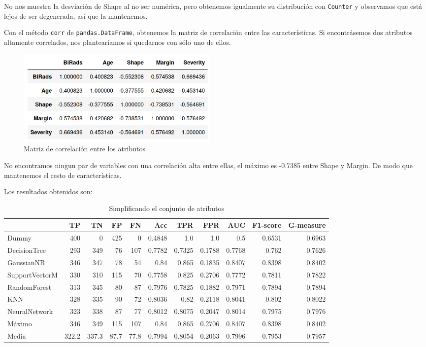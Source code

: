\documentclass{article}
\begin{document}
No nos muestra la desviación de Shape al no ser numérica, pero
obtenemos igualmente su distribución con \texttt{Counter} y observamos
que está lejos de ser degenerada, así que la mantenemos.

Con el método \texttt{corr} de \texttt{pandas.DataFrame}, obtenemos la
matriz de correlación entre las características. Si encontrásemos dos
atributos altamente correlados, nos plantearíamos si quedarnos con
sólo uno de ellos.

\begin{figure}[H]
  \centering
  \includegraphics[width=100mm]{figures/corr}
  \caption{Matriz de correlación entre los atributos}
  \label{fig:corr}
\end{figure}

No encontramos ningun par de variables con una correlación alta entre
ellas, el máximo es -0.7385 entre Shape y Margin. De modo que
mantenemos el resto de características.

Los resultados obtenidos son:

\begin{table}[H]
\centering
\caption{Simplificando el conjunto de atributos}
\label{tab:features}
\begin{tabular}{|lrrrrrrrrrr|}
\hline
 & TP & TN & FP & FN & Acc & TPR & FPR & AUC & F1-score & G-measure\\ \hline
Dummy & 400 & 0 & 425 & 0 & 0.4848 & 1.0 & 1.0 & 0.5 & 0.6531 & 0.6963\\
DecisionTree & 293 & 349 & 76 & 107 & 0.7782 & 0.7325 & 0.1788 & 0.7768 & 0.762 & 0.7626\\
GaussianNB & 346 & 347 & 78 & 54 & 0.84 & 0.865 & 0.1835 & 0.8407 & 0.8398 & 0.8402\\
SupportVectorM & 330 & 310 & 115 & 70 & 0.7758 & 0.825 & 0.2706 & 0.7772 & 0.7811 & 0.7822\\
RandomForest & 313 & 345 & 80 & 87 & 0.7976 & 0.7825 & 0.1882 & 0.7971 & 0.7894 & 0.7894\\
KNN & 328 & 335 & 90 & 72 & 0.8036 & 0.82 & 0.2118 & 0.8041 & 0.802 & 0.8022\\
NeuralNetwork & 323 & 338 & 87 & 77 & 0.8012 & 0.8075 & 0.2047 & 0.8014 & 0.7975 & 0.7976\\ \hline
Máximo & 346 & 349 & 115 & 107 & 0.84 & 0.865 & 0.2706 & 0.8407 & 0.8398 & 0.8402\\
Media & 322.2 & 337.3 & 87.7 & 77.8 & 0.7994 & 0.8054 & 0.2063 & 0.7996 & 0.7953 & 0.7957\\
\hline
\end{tabular}
\end{table}
\end{document}
